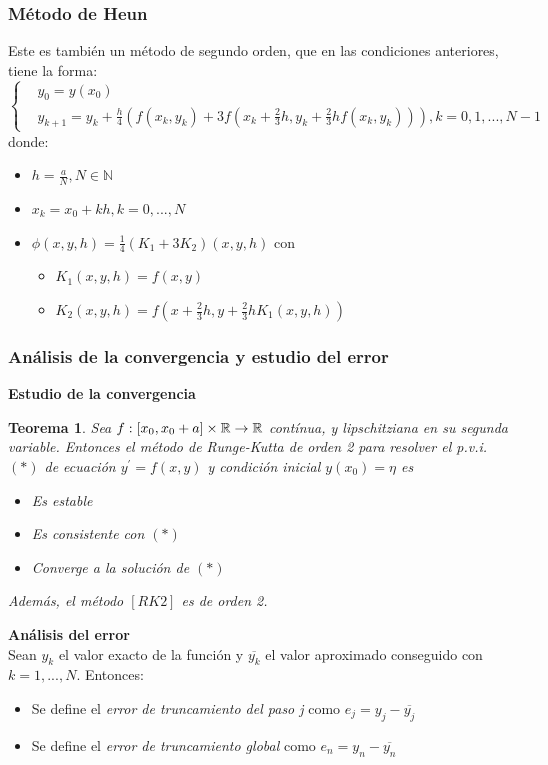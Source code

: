 \documentclass[paper=a4, fontsize=11pt]{scrartcl} %
\newtheorem{teo}{Teorema}[section]
\numberwithin{equation}{section}
\begin{document}
	\subsubsection{Método de Heun}
	Este es también un método de segundo orden, que en las condiciones anteriores, tiene la forma:
	\begin{equation*}
	[RK2.2]\begin{cases} 
	&\text{$y_0 = y(x_0)$}
	\\
	&\text{$y_{k+1} = y_k + \frac{h}{4}(f(x_k,y_k)+3f(x_k+\frac{2}{3}h,y_k+\frac{2}{3}hf(x_k,y_k))),  k= 0,1,...,N-1$} 
	\end{cases} 
	\end{equation*}
	donde:
	\begin{itemize}
		\item $h=\frac{a}{N} , N\in\mathbb{N}$
		\item $x_k = x_0 + kh , k=0,...,N$
		\item $\phi(x,y,h) = \frac{1}{4}(K_1+3K_2)(x,y,h)$ con 
			\begin{itemize}
				\item $K_1(x,y,h)=f(x,y)$
				\item $K_2(x,y,h)=f(x+\frac{2}{3}h,y+\frac{2}{3}hK_1(x,y,h))$
			\end{itemize}
		\end{itemize}
	
	
	\subsubsection{Análisis de la convergencia y estudio del error}
	\textbf{Estudio de la convergencia}
	
	\begin{teo} Sea $f: [x\textsubscript{0}, x\textsubscript{0}+a]\times\mathbb{R} \rightarrow \mathbb{R}$ contínua, y lipschitziana en su segunda variable. Entonces el método de Runge-Kutta de orden 2 para resolver el p.v.i.$(*)$ de ecuación $y^\prime =f(x, y)$ y condición inicial $y(x_0) = \eta$ es
		\begin{itemize}
			\item Es estable
			\item Es consistente con $(*)$
			\item Converge a la solución de $(*)$
		\end{itemize}
		Además, el método $[RK2]$ es de orden 2.
	\end{teo}
	
	\textbf{Análisis del error}\\
	Sean $y_k$ el valor exacto de la función y $\overline{y_k}$ el valor aproximado conseguido con $k = 1,...,N$. Entonces:
	\begin{itemize}
		\item Se define el \textit{error de truncamiento del paso j} como $e_j =y_j-\overline{y_j}$
		\item Se define el \textit{error de truncamiento global} como $e_n =y_n-\overline{y_n}$
	\end{itemize}
	
\end{document}
